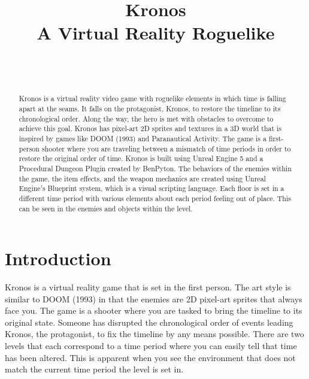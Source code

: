 \documentclass{sigchi}
\def\plaintitle{Kronos\\ \large A Virtual Reality Roguelike}
\begin{document}
\title{\plaintitle}

\author{%
  \\
  \\
}

\maketitle

\begin{abstract}
  Kronos is a virtual reality video game with roguelike elements in which time is falling apart at the seams. It falls on the protagonist, Kronos, to restore the timeline to its chronological order. Along the way, the hero is met with obstacles to overcome to achieve this goal. Kronos has pixel-art 2D sprites and textures in a 3D world that is inspired by games like DOOM (1993) and Paranautical Activity. The game is a first-person shooter where you are traveling between a mismatch of time periods in order to restore the original order of time. Kronos is built using Unreal Engine 5 and a Procedural Dungeon Plugin created by BenPyton. The behaviors of the enemies within the game, the item effects, and the weapon mechanics are created using Unreal Engine’s Blueprint system, which is a visual scripting language. Each floor is set in a different time period with various elements about each period feeling out of place. This can be seen in the enemies and objects within the level.
\end{abstract}





\section{Introduction}
Kronos is a virtual reality game that is set in the first person. The art style is similar to DOOM (1993) in that the enemies are 2D pixel-art sprites that always face you. The game is a shooter where you are tasked to bring the timeline to its original state. Someone has disrupted the chronological order of events leading Kronos, the protagonist, to fix the timeline by any means possible. There are two levels that each correspond to a time period where you can easily tell that time has been altered. This is apparent when you see the environment that does not match the current time period the level is set in. 
\end{document}
